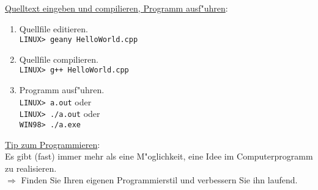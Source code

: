 \underline{Quelltext eingeben und compilieren, Programm ausf"uhren}:
\begin{enumerate}
 \item Quellfile editieren.  \\
       \texttt{LINUX> geany HelloWorld.cpp}
 \item Quellfile compilieren.  \\
	\texttt{LINUX> g++ HelloWorld.cpp}
 \item Programm ausf"uhren.  \\
	\texttt{LINUX> a.out} \qquad oder \\
	\texttt{LINUX> ./a.out} \qquad oder \\
	\texttt{WIN98> ./a.exe}
\end{enumerate}
%
%
\underline{Tip zum Programmieren}: \\
 Es gibt (fast) immer mehr als eine M"oglichkeit, eine Idee im
 Computerprogramm zu realisieren. \\
 $\Longrightarrow$ Finden Sie Ihren eigenen Programmierstil
 	und verbessern Sie ihn laufend.
%
%
%
\newpage
